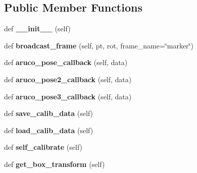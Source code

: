 \subsection*{Public Member Functions}
\begin{DoxyCompactItemize}
\item 
\hypertarget{classcamera__calib_1_1_baxter___eye___hand___calib_af3ebb65cba8f8de8553341c5403c58a7}{}\label{classcamera__calib_1_1_baxter___eye___hand___calib_af3ebb65cba8f8de8553341c5403c58a7} 
def {\bfseries \+\_\+\+\_\+init\+\_\+\+\_\+} (self)
\item 
\hypertarget{classcamera__calib_1_1_baxter___eye___hand___calib_a8e93d01429d7bb4c08223f39534c8ef7}{}\label{classcamera__calib_1_1_baxter___eye___hand___calib_a8e93d01429d7bb4c08223f39534c8ef7} 
def {\bfseries broadcast\+\_\+frame} (self, pt, rot, frame\+\_\+name=\char`\"{}marker\char`\"{})
\item 
\hypertarget{classcamera__calib_1_1_baxter___eye___hand___calib_aca31a7a1cfdca2ec3372486aaed8acec}{}\label{classcamera__calib_1_1_baxter___eye___hand___calib_aca31a7a1cfdca2ec3372486aaed8acec} 
def {\bfseries aruco\+\_\+pose\+\_\+callback} (self, data)
\item 
\hypertarget{classcamera__calib_1_1_baxter___eye___hand___calib_ade3d07a10851812da684461e39d88fef}{}\label{classcamera__calib_1_1_baxter___eye___hand___calib_ade3d07a10851812da684461e39d88fef} 
def {\bfseries aruco\+\_\+pose2\+\_\+callback} (self, data)
\item 
\hypertarget{classcamera__calib_1_1_baxter___eye___hand___calib_a059748e2d24c83d877effbf9dc093271}{}\label{classcamera__calib_1_1_baxter___eye___hand___calib_a059748e2d24c83d877effbf9dc093271} 
def {\bfseries aruco\+\_\+pose3\+\_\+callback} (self, data)
\item 
\hypertarget{classcamera__calib_1_1_baxter___eye___hand___calib_a86d89cb18fb192dd81e045415036457c}{}\label{classcamera__calib_1_1_baxter___eye___hand___calib_a86d89cb18fb192dd81e045415036457c} 
def {\bfseries save\+\_\+calib\+\_\+data} (self)
\item 
\hypertarget{classcamera__calib_1_1_baxter___eye___hand___calib_a5c601642e0efcaca54ac63417e0f824d}{}\label{classcamera__calib_1_1_baxter___eye___hand___calib_a5c601642e0efcaca54ac63417e0f824d} 
def {\bfseries load\+\_\+calib\+\_\+data} (self)
\item 
\hypertarget{classcamera__calib_1_1_baxter___eye___hand___calib_aeeb5e99b79b3c69dd13d5ac2f01708f6}{}\label{classcamera__calib_1_1_baxter___eye___hand___calib_aeeb5e99b79b3c69dd13d5ac2f01708f6} 
def {\bfseries self\+\_\+calibrate} (self)
\item 
\hypertarget{classcamera__calib_1_1_baxter___eye___hand___calib_ace15c3cc82853360ec6bddb2c89aaa27}{}\label{classcamera__calib_1_1_baxter___eye___hand___calib_ace15c3cc82853360ec6bddb2c89aaa27} 
def {\bfseries get\+\_\+box\+\_\+transform} (self)
\end{DoxyCompactItemize}
